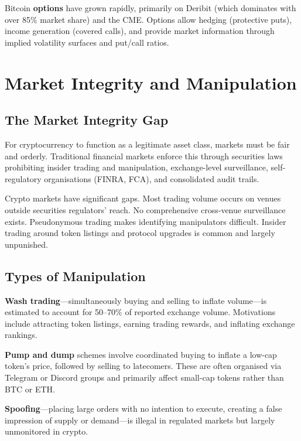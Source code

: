 \documentclass[11pt,a4paper]{article}
\newcommand{\keyword}[1]{\textbf{\textcolor{AccentOrange}{#1}}}
\begin{document}
Bitcoin \keyword{options} have grown rapidly, primarily on Deribit (which dominates with over 85\% market share) and the CME. Options allow hedging (protective puts), income generation (covered calls), and provide market information through implied volatility surfaces and put/call ratios.

\section{Market Integrity and Manipulation}

\subsection{The Market Integrity Gap}

For cryptocurrency to function as a legitimate asset class, markets must be fair and orderly. Traditional financial markets enforce this through securities laws prohibiting insider trading and manipulation, exchange-level surveillance, self-regulatory organisations (FINRA, FCA), and consolidated audit trails.

Crypto markets have significant gaps. Most trading volume occurs on venues outside securities regulators' reach. No comprehensive cross-venue surveillance exists. Pseudonymous trading makes identifying manipulators difficult. Insider trading around token listings and protocol upgrades is common and largely unpunished.

\subsection{Types of Manipulation}

\keyword{Wash trading}---simultaneously buying and selling to inflate volume---is estimated to account for 50--70\% of reported exchange volume. Motivations include attracting token listings, earning trading rewards, and inflating exchange rankings.

\keyword{Pump and dump} schemes involve coordinated buying to inflate a low-cap token's price, followed by selling to latecomers. These are often organised via Telegram or Discord groups and primarily affect small-cap tokens rather than BTC or ETH.

\keyword{Spoofing}---placing large orders with no intention to execute, creating a false impression of supply or demand---is illegal in regulated markets but largely unmonitored in crypto.
\end{document}
